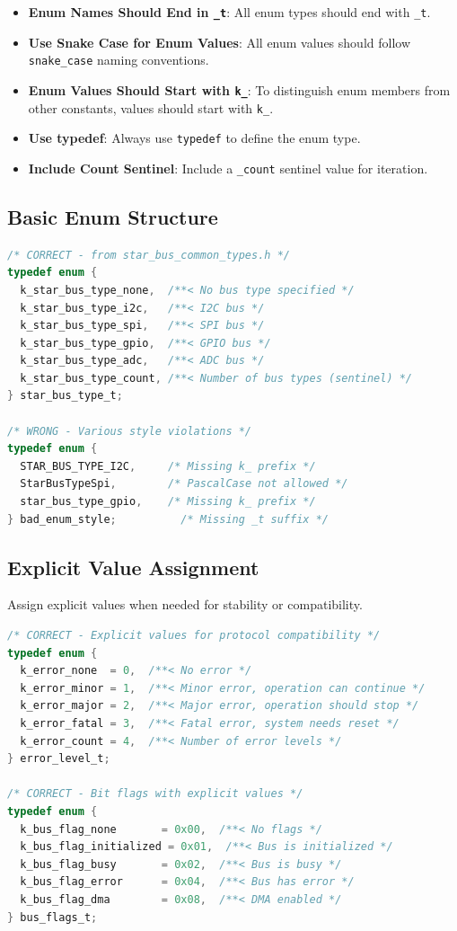 \begin{itemize}
    \item \textbf{Enum Names Should End in \texttt{\_t}}: All enum types should end with \texttt{\_t}.
    \item \textbf{Use Snake Case for Enum Values}: All enum values should follow \texttt{snake\_case} naming conventions.
    \item \textbf{Enum Values Should Start with \texttt{k\_}}: To distinguish enum members from other constants, values should start with \texttt{k\_}.
    \item \textbf{Use typedef}: Always use \texttt{typedef} to define the enum type.
    \item \textbf{Include Count Sentinel}: Include a \texttt{\_count} sentinel value for iteration.
\end{itemize}

\subsection{Basic Enum Structure}

\begin{lstlisting}[language=C]
/* CORRECT - from star_bus_common_types.h */
typedef enum {
  k_star_bus_type_none,  /**< No bus type specified */
  k_star_bus_type_i2c,   /**< I2C bus */
  k_star_bus_type_spi,   /**< SPI bus */
  k_star_bus_type_gpio,  /**< GPIO bus */
  k_star_bus_type_adc,   /**< ADC bus */
  k_star_bus_type_count, /**< Number of bus types (sentinel) */
} star_bus_type_t;

/* WRONG - Various style violations */
typedef enum {
  STAR_BUS_TYPE_I2C,     /* Missing k_ prefix */
  StarBusTypeSpi,        /* PascalCase not allowed */
  star_bus_type_gpio,    /* Missing k_ prefix */
} bad_enum_style;          /* Missing _t suffix */
\end{lstlisting}

\subsection{Explicit Value Assignment}

Assign explicit values when needed for stability or compatibility.

\begin{lstlisting}[language=C]
/* CORRECT - Explicit values for protocol compatibility */
typedef enum {
  k_error_none  = 0,  /**< No error */
  k_error_minor = 1,  /**< Minor error, operation can continue */
  k_error_major = 2,  /**< Major error, operation should stop */
  k_error_fatal = 3,  /**< Fatal error, system needs reset */
  k_error_count = 4,  /**< Number of error levels */
} error_level_t;

/* CORRECT - Bit flags with explicit values */
typedef enum {
  k_bus_flag_none       = 0x00,  /**< No flags */
  k_bus_flag_initialized = 0x01,  /**< Bus is initialized */
  k_bus_flag_busy       = 0x02,  /**< Bus is busy */
  k_bus_flag_error      = 0x04,  /**< Bus has error */
  k_bus_flag_dma        = 0x08,  /**< DMA enabled */
} bus_flags_t;
\end{lstlisting}

